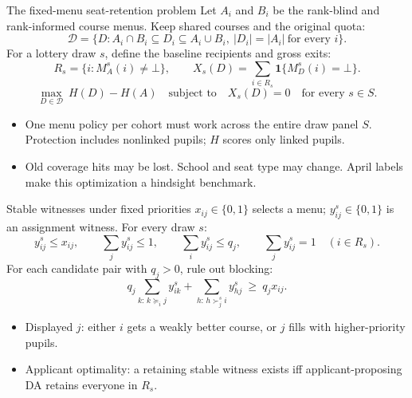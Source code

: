 \begin{frame}{The fixed-menu seat-retention problem}
\small
\setlength{\abovedisplayskip}{3pt}
\setlength{\belowdisplayskip}{3pt}
Let $A_i$ and $B_i$ be the rank-blind and rank-informed course menus.
Keep shared courses and the original quota:
\[
 \mathcal D=\{D: A_i\cap B_i\subseteq D_i\subseteq A_i\cup B_i,
                 \ |D_i|=|A_i|\ \text{for every }i\}.
\]
For a lottery draw $s$, define the baseline recipients and gross exits:
\[
 R_s=\{i:M_A^s(i)\ne\bot\},\qquad
 X_s(D)=\sum_{i\in R_s}\mathbf{1}\{M_D^s(i)=\bot\}.
\]
\[
 \max_{D\in\mathcal D}\ H(D)-H(A)
 \quad\text{subject to}\quad X_s(D)=0\quad\text{for every }s\in S.
\]
\begin{itemize}
  \item One menu policy per cohort must work across the entire draw panel $S$.
  Protection includes nonlinked pupils; $H$ scores only linked pupils.
  \item Old coverage hits may be lost. School and seat type may change.
  April labels make this optimization a hindsight benchmark.
\end{itemize}
\end{frame}

\begin{frame}{Stable witnesses under fixed priorities}
\small
\setlength{\abovedisplayskip}{3pt}
\setlength{\belowdisplayskip}{3pt}
$x_{ij}\in\{0,1\}$ selects a menu; $y^s_{ij}\in\{0,1\}$ is an assignment witness.
For every draw $s$:
\[
 y^s_{ij}\le x_{ij},\qquad
 \sum_j y^s_{ij}\le1,\qquad
 \sum_i y^s_{ij}\le q_j,\qquad
 \sum_j y^s_{ij}=1\quad(i\in R_s).
\]
For each candidate pair with $q_j>0$, rule out blocking:
\[
 q_j\sum_{k:\,k\succeq_i j}y^s_{ik}
 +\sum_{h:\,h\succ_j^s i}y^s_{hj}
 \ \ge\ q_j x_{ij}.
\]
\begin{itemize}
  \item Displayed $j$: either $i$ gets a weakly better course,
  or $j$ fills with higher-priority pupils.
  \item Applicant optimality: a retaining stable witness exists iff
  applicant-proposing DA retains everyone in $R_s$.
\end{itemize}
\end{frame}

